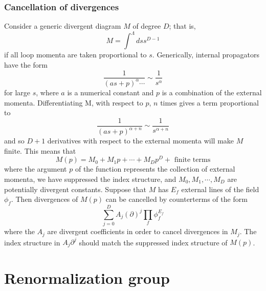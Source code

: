 \subsubsection{Cancellation of divergences}
Consider a generic divergent diagram $M$ of degree $D$; that is,
\[M = \int^{\Lambda} ds s^{D-1}\]
if all loop momenta are taken proportional to $s$. Generically, internal propagators have the form
\[\frac{1}{(as+p)^{\alpha}\cdots} \sim \frac{1}{s^{\alpha}}\]
for large $s$, where $a$ is a numerical constant and $p$ is a combination of the external momenta. Differentiating M,
with respect to $p$, $n$ times gives a term proportional to
\[\frac{1}{(as+p)^{\alpha+n}} \sim \frac{1}{s^{\alpha + n}} \]
and so $D+1$ derivatives with respect to the external momenta will make $M$ finite. This means that
\[M(p) = M_0 + M_1 p + \cdots + M_D p^D + \mbox{ finite terms}\]
where the argument $p$ of the function represents the collection of external momenta, we have suppressed the index structure, and $M_0,M_1,\cdots,M_D$ are potentially divergent constants. Suppose that $M$ has $E_f$ external lines of the field $\phi_f$. Then divergences of $M(p)$ can be cancelled by counterterms of the form
\[\sum_{j=0}^D A_j (\partial)^j \prod_f \phi_f^{E_f}\]
where the $A_j$ are divergent coefficients in order to cancel divergences in $M_j$. The index structure in $A_j \partial^j$ should
match the suppressed index structure of $M(p)$.

\section{Renormalization group}
